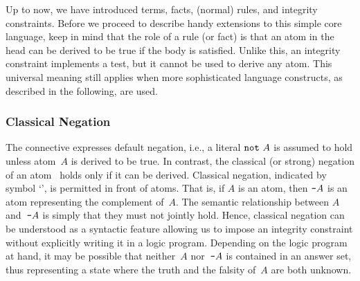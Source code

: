 Up to now, we have introduced terms, facts, (normal) rules, and integrity constraints.
Before we proceed to describe handy extensions to this simple core language,
keep in mind that the role of a rule (or fact) is that an atom in the
head can be derived to be true if the body is satisfied.
Unlike this, an integrity constraint implements a test,
but it cannot be used to derive any atom.
This universal meaning still applies when more sophisticated language constructs,
as described in the following, are used.

\subsubsection{Classical Negation}\label{subsec:gringo:negation}

The connective  expresses default negation,
i.e., a literal $\texttt{not}~A$ is assumed to hold unless atom~$A$ is derived to be true.
In contrast, the classical (or strong) negation of an atom~\cite{gellif91a}
holds only if it can be derived.
Classical negation, indicated by symbol `\code{-}', is permitted in front of atoms.
That is, if $A$ is an atom, then $\texttt{-}A$ is
an atom representing the complement of~$A$.
The semantic relationship between $A$ and~$\texttt{-}A$
is simply that they
must not jointly hold.
Hence,
classical negation can be understood as a syntactic feature
allowing us to impose an integrity constraint 
without explicitly writing it in a logic program.
Depending on the logic program at hand,
it may be possible that neither~$A$ nor~$\texttt{-}A$ is contained in an answer set,
thus representing a state where the truth and the falsity of~$A$ are both unknown.

